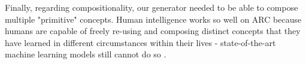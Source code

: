 Finally, regarding compositionality, our generator needed to be able to compose multiple "primitive" concepts. Human intelligence works so well on ARC because humans are capable of freely re-using and composing distinct concepts that they have learned in different circumstances within their lives - state-of-the-art machine learning models still cannot do so \cite{Faith_Fate}. 
